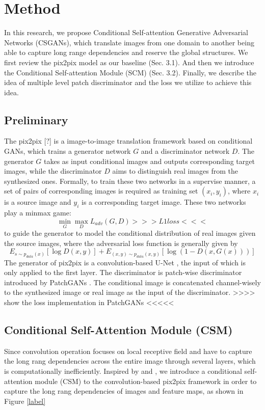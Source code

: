 \section{Method}
In this research, we propose Conditional Self-attention Generative Adversarial Networks (CSGANs), which translate images from one domain to another being able to capture long range dependencies and reserve the global structures. We first review the pix2pix model as our baseline (Sec. 3.1). And then we introduce the Conditional Self-attention Module (SCM) (Sec. 3.2). Finally, we describe the idea of multiple level patch discriminator and the loss we utilize to achieve this idea.
\subsection{Preliminary}
The pix2pix [?] is a image-to-image translation framework based on conditional GANs, which trains a generator network $G$ and a discriminator network $D$. The generator $G$ takes as input conditional images and outputs corresponding target images, while the discriminator $D$ aims to distinguish real images from the synthesized ones. Formally, to train these two networks in a supervise manner, a set of pairs of corresponding images is required as training set ${(x_i, y_i)}$, where $x_i$ is a source image and $y_i$ is a corresponding target image. These two networks play a minmax game:
\begin{equation}
\label{eqn:minmax_game}
\min_G \max_D L_{adv}(G,D) >>>L1 loss<<<
\end{equation}
to guide the generator to model the conditional distribution of real images given the source images, where the adversarial loss function is generally given by 
\begin{equation}
\label{eqn:loss_adv}
E_{s\sim p_{data}(x)}[\log D(x,y)]+E_{(x,y)\sim p_{data}(x,y)}[\log(1-D(x,G(x)))]
\end{equation}
The generator of pix2pix is a convolution-based U-Net \cite{Unet}, the input of which is only applied to the first layer. The discriminator is patch-wise discriminator introduced by PatchGANs \cite{PatchGANs}. The conditional image is concatenated channel-wisely to the synthesized image or real image as the input of the discriminator.
>>>> show the loss implementation in PatchGANs <<<<<

\subsection{Conditional Self-Attention Module (CSM)}
Since convolution operation focuses on local receptive field and have to capture the long rang dependencies across the entire image through several layers, which is computationally inefficiently. Inspired by \cite{non-local} and \cite{SAGANs}, we introduce a conditional self-attention module (CSM) to the convolution-based pix2pix framework in order to capture the long rang dependencies of images and feature maps, as shown in Figure \ref{label}

